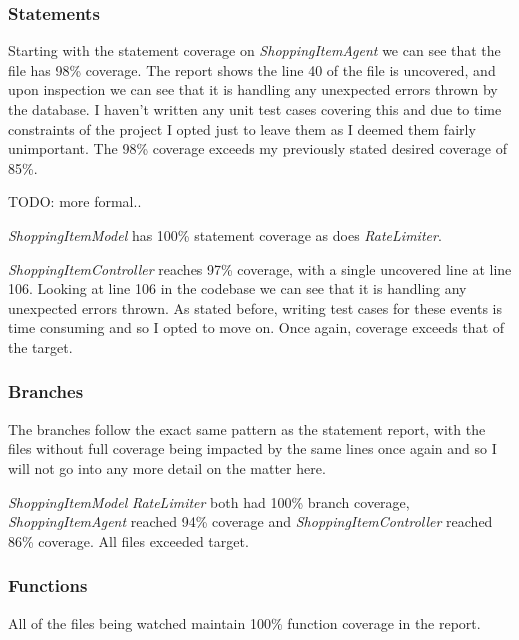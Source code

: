 \subsubsection{Statements}
Starting with the statement coverage on \textit{ShoppingItemAgent} we can see that the file has 98\% coverage. The report shows the line 40 of the file is uncovered, and upon inspection we can see that it is handling any unexpected errors thrown by the database. I haven't written any unit test cases covering this and due to time constraints of the project I opted just to leave them as I deemed them fairly unimportant. The 98\% coverage exceeds my previously stated desired coverage of 85\%.

TODO: more formal..

\textit{ShoppingItemModel} has 100\% statement coverage as does \textit{RateLimiter}.

\textit{ShoppingItemController} reaches 97\% coverage, with a single uncovered line at line 106. Looking at line 106 in the codebase we can see that it is handling any unexpected errors thrown. As stated before, writing test cases for these events is time consuming and so I opted to move on. Once again, coverage exceeds that of the target. 
\subsubsection{Branches}
The branches follow the exact same pattern as the statement report, with the files without full coverage being impacted by the same lines once again and so I will not go into any more detail on the matter here.

\textit{ShoppingItemModel} \textit{RateLimiter} both had 100\% branch coverage, \textit{ShoppingItemAgent} reached 94\% coverage and \textit{ShoppingItemController} reached 86\% coverage. All files exceeded target.

\subsubsection{Functions}
All of the files being watched maintain 100\% function coverage in the report.
